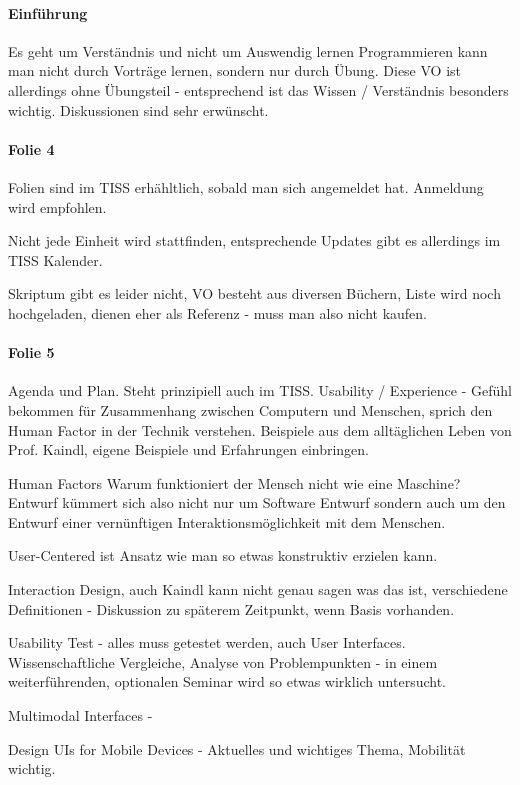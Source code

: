 \paragraph{Einführung}
Es geht um Verständnis und nicht um Auswendig lernen
Programmieren kann man nicht durch Vorträge lernen, sondern nur durch Übung.
Diese VO ist allerdings ohne Übungsteil - entsprechend ist das Wissen / Verständnis
besonders wichtig. 
Diskussionen sind sehr erwünscht.

\paragraph{Folie 4}
Folien sind im TISS erhähltlich, sobald man sich angemeldet hat. Anmeldung wird
empfohlen.

Nicht jede Einheit wird stattfinden, entsprechende Updates gibt es allerdings
im TISS Kalender. 

Skriptum gibt es leider nicht, VO besteht aus diversen Büchern, Liste wird noch
hochgeladen, dienen eher als Referenz - muss man also nicht kaufen.

\paragraph{Folie 5}
Agenda und Plan. Steht prinzipiell auch im TISS.
Usability / Experience - Gefühl bekommen für Zusammenhang zwischen Computern und 
Menschen, sprich den Human Factor in der Technik verstehen.
Beispiele aus dem alltäglichen Leben von Prof. Kaindl, eigene Beispiele und Erfahrungen
einbringen.

Human Factors
Warum funktioniert der Mensch nicht wie eine Maschine? Entwurf kümmert sich also
nicht nur um Software Entwurf sondern auch um den Entwurf einer vernünftigen 
Interaktionsmöglichkeit mit dem Menschen. 

User-Centered ist Ansatz wie man so etwas konstruktiv erzielen kann. 

Interaction Design, auch Kaindl kann nicht genau sagen was das ist, verschiedene
Definitionen - Diskussion zu späterem Zeitpunkt, wenn Basis vorhanden.

Usability Test - alles muss getestet werden, auch User Interfaces. Wissenschaftliche
Vergleiche, Analyse von Problempunkten - in einem weiterführenden, optionalen Seminar
wird so etwas wirklich untersucht.

Multimodal Interfaces - 

Design UIs for Mobile Devices - Aktuelles und wichtiges Thema, Mobilität wichtig.

